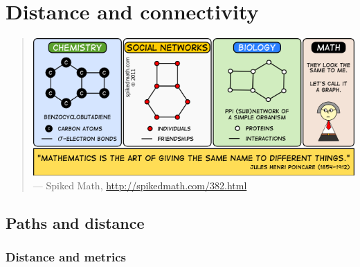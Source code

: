 
\chapter{Distance and connectivity}
\label{chap:distance_connectivity}

\begin{quote}
\footnotesize
{}
\includegraphics[scale=0.85]{image/distance-connectivity/what-is-math} \\
\noindent
--- Spiked Math,
\url{http://spikedmath.com/382.html}
\end{quote}



\section{Paths and distance}



\subsection{Distance and metrics}

